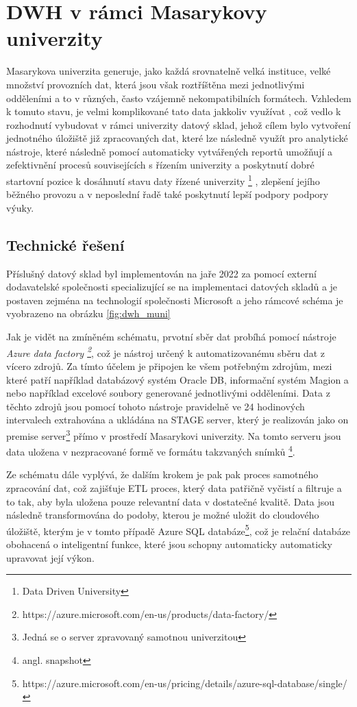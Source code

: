 \documentclass[
  digital,     %
  twoside,     %
  lof,         %
  lot,         %
]{fithesis4}
\begin{document}
\chapter{DWH v rámci Masarykovy univerzity}
Masarykova univerzita generuje, jako každá srovnatelně velká instituce, velké množství provozních dat, která jsou však roztříštěna mezi jednotlivými odděleními a to v různých, často vzájemně nekompatibilních formátech. Vzhledem k tomuto stavu, je velmi komplikované tato data jakkoliv využívat , což vedlo k rozhodnutí  vybudovat v rámci univerzity datový sklad, jehož cílem bylo vytvoření jednotného úložiště již zpracovaných dat,  které lze následně využít pro analytické nástroje, které následně pomocí automaticky vytvářených reportů umožňují a zefektivnění  procesů souvisejících s řízením univerzity a poskytnutí dobré startovní pozice k dosáhnutí stavu daty řízené univerzity \footnote{Data Driven University} , zlepšení jejího běžného provozu a v neposlední řadě také poskytnutí lepší podpory podpory výuky.

\section{Technické řešení}
Příslušný datový sklad byl implementován na jaře 2022 za pomocí externí dodavatelské společnosti specializující se na implementaci datových skladů  a je postaven zejména na technologií společnosti Microsoft a jeho rámcové schéma je vyobrazeno na obrázku \ref{fig:dwh_muni}

Jak je vidět na zmíněném schématu, prvotní sběr dat probíhá pomocí nástroje \emph{Azure data factory \footnote{https://azure.microsoft.com/en-us/products/data-factory/}}, což je nástroj určený k automatizovanému sběru dat z vícero zdrojů. Za tímto účelem je připojen ke všem potřebným zdrojům, mezi které patří například databázový systém Oracle DB, informační systém Magion a nebo například excelové soubory generované jednotlivými odděleními. Data z těchto zdrojů jsou pomocí tohoto nástroje pravidelně ve 24 hodinových intervalech extrahována a ukládána na STAGE server, který je realizován jako on premise server\footnote{Jedná se o server zpravovaný samotnou univerzitou} přímo v prostředí Masarykovi univerzity. Na tomto serveru jsou data uložena v nezpracované formě ve formátu takzvaných snímků \footnote{angl. snapshot}.

Ze schématu dále vyplývá, že dalším krokem je pak pak proces samotného zpracování dat, což zajišťuje ETL proces, který data patřičně vyčistí a filtruje a to tak, aby byla uložena pouze relevantní data v dostatečné kvalitě. Data jsou následně transformována do podoby, kterou je možné uložit do cloudového úložiště, kterým je v tomto případě Azure SQL databáze\footnote{https://azure.microsoft.com/en-us/pricing/details/azure-sql-database/single/}, což je relační databáze obohacená o inteligentní funkce, které jsou schopny automaticky automaticky upravovat její výkon.
\end{document}
